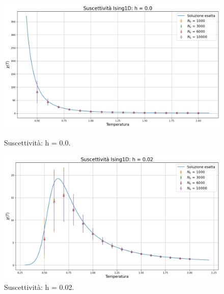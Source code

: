 \begin{figure}[htbp]
    \centering
    \begin{minipage}{0.5\textwidth}  
      \centering
      \includegraphics[page=1, width=\textwidth]{Immagini/simIsing1D/chi_h0.0.png}
      \caption{Suscettività: h = 0.0.}
    \end{minipage}\hfill
    \begin{minipage}{0.5\textwidth}  
      \centering
      \includegraphics[page=1, width=\textwidth]{Immagini/simIsing1D/chi_h0.02.png}
      \caption{Suscettività: h = 0.02.}
    \end{minipage}
\end{figure}

